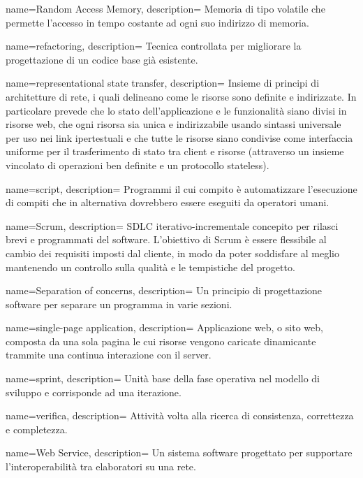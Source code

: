  {
name=Random Access Memory,
description={
Memoria di tipo volatile che permette l'accesso in tempo costante ad ogni suo
indirizzo di memoria.
}
}

 {
name=refactoring,
description={
Tecnica controllata per migliorare la progettazione di un codice base già
esistente.
}
}

 {
name=representational state transfer,
description={
Insieme di principi di architetture di rete, i quali delineano come le risorse
sono definite e indirizzate. In particolare prevede che lo stato
dell’applicazione e le funzionalità siano divisi in risorse web, che ogni
risorsa sia unica e indirizzabile usando sintassi universale per uso nei link
ipertestuali e che tutte le risorse siano condivise come interfaccia uniforme
per il trasferimento di stato tra client e risorse (attraverso un insieme
vincolato di operazioni ben definite e un protocollo stateless).
}
}

 {
name=script,
description={
Programmi il cui compito è automatizzare l'esecuzione di compiti che in
alternativa dovrebbero essere eseguiti da operatori umani.
}
}

 {
name=Scrum,
description={
SDLC iterativo-incrementale concepito per rilasci brevi e programmati del
software. L'obiettivo di Scrum è essere flessibile al cambio dei requisiti
imposti dal cliente, in modo da poter soddisfare al meglio mantenendo un
controllo sulla qualità e le tempistiche del progetto.
}
}

 {
name=Separation of concerns,
description={
Un principio di progettazione software per separare un programma in varie
sezioni.
}
}

 {
name=single-page application,
description={
Applicazione web, o sito web, composta da una sola pagina le cui risorse vengono
caricate dinamicante trammite una continua interazione con il server.
}
}

 {
name=sprint,
description={
Unità base della fase operativa nel modello di sviluppo  e
corrisponde ad una iterazione.
}
}

 {
name=verifica,
description={
Attività volta alla ricerca di consistenza, correttezza e completezza.
}
}

 {
name=Web Service,
description={
Un sistema software progettato per supportare l'interoperabilità tra elaboratori
su una rete.
}
}

